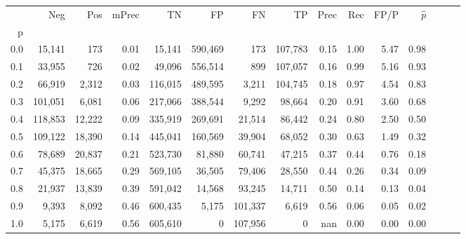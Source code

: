 \begin{tabular}{rrrrrrrrrrrrrrr}
\toprule
{} &      Neg &     Pos & mPrec &       TN &       FP &       FN &       TP &  Prec &   Rec &  FP/P & $\hat{p}$ \\
p   &          &         &       &          &          &          &          &       &       &       &           \\
\midrule
0.0 &   15,141 &     173 &  0.01 &   15,141 &  590,469 &      173 &  107,783 &  0.15 &  1.00 &  5.47 &      0.98 \\
0.1 &   33,955 &     726 &  0.02 &   49,096 &  556,514 &      899 &  107,057 &  0.16 &  0.99 &  5.16 &      0.93 \\
0.2 &   66,919 &   2,312 &  0.03 &  116,015 &  489,595 &    3,211 &  104,745 &  0.18 &  0.97 &  4.54 &      0.83 \\
0.3 &  101,051 &   6,081 &  0.06 &  217,066 &  388,544 &    9,292 &   98,664 &  0.20 &  0.91 &  3.60 &      0.68 \\
0.4 &  118,853 &  12,222 &  0.09 &  335,919 &  269,691 &   21,514 &   86,442 &  0.24 &  0.80 &  2.50 &      0.50 \\
0.5 &  109,122 &  18,390 &  0.14 &  445,041 &  160,569 &   39,904 &   68,052 &  0.30 &  0.63 &  1.49 &      0.32 \\
0.6 &   78,689 &  20,837 &  0.21 &  523,730 &   81,880 &   60,741 &   47,215 &  0.37 &  0.44 &  0.76 &      0.18 \\
0.7 &   45,375 &  18,665 &  0.29 &  569,105 &   36,505 &   79,406 &   28,550 &  0.44 &  0.26 &  0.34 &      0.09 \\
0.8 &   21,937 &  13,839 &  0.39 &  591,042 &   14,568 &   93,245 &   14,711 &  0.50 &  0.14 &  0.13 &      0.04 \\
0.9 &    9,393 &   8,092 &  0.46 &  600,435 &    5,175 &  101,337 &    6,619 &  0.56 &  0.06 &  0.05 &      0.02 \\
1.0 &    5,175 &   6,619 &  0.56 &  605,610 &        0 &  107,956 &        0 &   nan &  0.00 &  0.00 &      0.00 \\
\bottomrule
\end{tabular}
